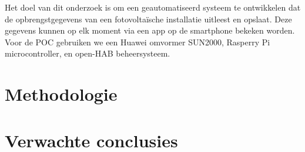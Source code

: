 \documentclass{hogent-article}
\begin{document}
    Het doel van dit onderzoek is om een geautomatiseerd systeem te ontwikkelen dat de opbrengstgegevens van een fotovoltaïsche installatie uitleest en opslaat. Deze gegevens kunnen op elk moment via een app op de smartphone bekeken worden. Voor de POC gebruiken we een Huawei omvormer SUN2000, Rasperry Pi microcontroller, en open-HAB beheersysteem.
    
    \section{Methodologie}
    
    
    \lipsum[10-12]
    
    \section{Verwachte conclusies}
    
    
    \lipsum[14-18]
    
    
    \printbibliography[heading=bibintoc]
    
\end{document}
